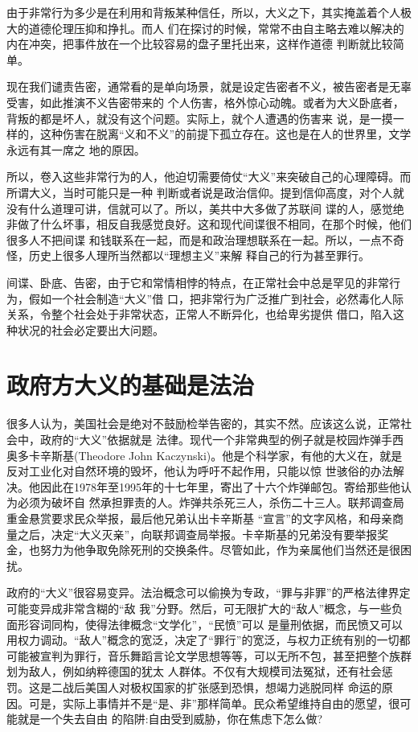 \documentclass[10pt]{article}
\begin{document}
{由于非常行为多少是在利用和背叛某种信任，所以，大义之下，其实掩盖着个人极大的道德伦理压抑和挣扎。而人
们在探讨的时候，常常不由自主略去难以解决的内在冲突，把事件放在一个比较容易的盘子里托出来，这样作道德
判断就比较简单。

现在我们谴责告密，通常看的是单向场景，就是设定告密者不义，被告密者是无辜受害，如此推演不义告密带来的
个人伤害，格外惊心动魄。或者为大义卧底者，背叛的都是坏人，就没有这个问题。实际上，就个人遭遇的伤害来
说，是一摸一样的，这种伤害在脱离``义和不义''的前提下孤立存在。这也是在人的世界里，文学永远有其一席之
地的原因。

所以，卷入这些非常行为的人，他迫切需要倚仗``大义''来突破自己的心理障碍。而所谓大义，当时可能只是一种
判断或者说是政治信仰。提到信仰高度，对个人就没有什么道理可讲，信就可以了。所以，美共中大多做了苏联间
谍的人，感觉绝非做了什么坏事，相反自我感觉良好。这和现代间谍很不相同，在那个时候，他们很多人不把间谍
和钱联系在一起，而是和政治理想联系在一起。所以，一点不奇怪，历史上很多人理所当然都以``理想主义''来解
释自己的行为甚至罪行。

间谍、卧底、告密，由于它和常情相悖的特点，在正常社会中总是罕见的非常行为，假如一个社会制造``大义''借
口，把非常行为广泛推广到社会，必然毒化人际关系，令整个社会处于非常状态，正常人不断异化，也给卑劣提供
借口，陷入这种状况的社会必定要出大问题。

\pagebreak
\section{政府方大义的基础是法治}

很多人认为，美国社会是绝对不鼓励检举告密的，其实不然。应该这么说，正常社会中，政府的``大义''依据就是
法律。现代一个非常典型的例子就是校园炸弹手西奥多\textperiodcentered 卡辛斯基(Theodore John
Kaczynski)。他是个科学家，有他的大义在，就是反对工业化对自然环境的毁坏，他认为呼吁不起作用，只能以惊
世骇俗的办法解决。他因此在1978年至1995年的十七年里，寄出了十六个炸弹邮包。寄给那些他认为必须为破坏自
然承担罪责的人。炸弹共杀死三人，杀伤二十三人。联邦调查局重金悬赏要求民众举报，最后他兄弟认出卡辛斯基
``宣言''的文字风格，和母亲商量之后，决定``大义灭亲''，向联邦调查局举报。卡辛斯基的兄弟没有要举报奖
金，也努力为他争取免除死刑的交换条件。尽管如此，作为亲属他们当然还是很困扰。

政府的``大义''很容易变异。法治概念可以偷换为专政，``罪与非罪''的严格法律界定可能变异成非常含糊的``敌
我''分野。然后，可无限扩大的``敌人''概念，与一些负面形容词同构，使得法律概念``文学化''，``民愤''可以
是量刑依据，而民愤又可以用权力调动。``敌人''概念的宽泛，决定了``罪行''的宽泛，与权力正统有别的一切都
可能被宣判为罪行，音乐舞蹈言论文学思想等等，可以无所不包，甚至把整个族群划为敌人，例如纳粹德国的犹太
人群体。不仅有大规模司法冤狱，还有社会惩罚。这是二战后美国人对极权国家的扩张感到恐惧，想竭力逃脱同样
命运的原因。可是，实际上事情并不是``是、非''那样简单。民众希望维持自由的愿望，很可能就是一个失去自由
的陷阱:自由受到威胁，你在焦虑下怎么做?

}
\end{document}
